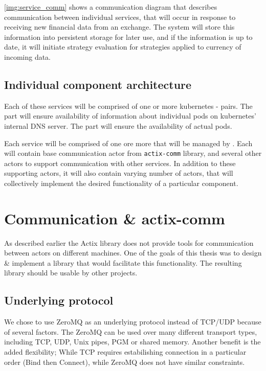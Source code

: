 \autoref{img:service_comm} shows a communication diagram that describes communication between individual services, that
will occur in response to receiving new financial data from an exchange. The system will store this information
into persistent storage for later use, and if the information is up to date, it will initiate strategy evaluation
for strategies applied to currency of incoming data.

\subsection{Individual component architecture}
Each of these services will be comprised of one or more kubernetes - pairs. The
 part will ensure availability of information about individual pods on kubernetes' internal DNS server.
The  part will ensure the availability of actual pods.

Each service will be comprised of one ore more  that will be managed by . Each 
will contain base communication actor from \verb|actix-comm| library, and several other actors to support communication with other services. In addition to
these supporting actors, it will also contain varying number of actors, that will collectively implement
the desired functionality of a particular component.

\section{Communication \& actix-comm}
\label{section:actix_comm}
As described earlier the Actix library does not provide tools for communication between actors on different machines. One of the
goals of this thesis was to design \& implement a library that would facilitate this functionality. The resulting library
should be usable by other projects.

\subsection{Underlying protocol}
We chose to use ZeroMQ\cite{hintjens2011} as an underlying protocol instead of TCP/UDP because of several factors. The ZeroMQ can be used over
many different transport types, including TCP, UDP, Unix pipes, PGM or shared memory. Another benefit is the added flexibility; While
TCP requires estabilishing connection in a particular order (Bind then Connect), while ZeroMQ does not have similar constraints.

